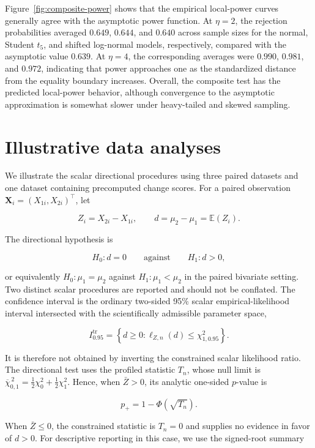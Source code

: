 \documentclass[11pt]{article}
\theoremstyle{remark}
\newcommand{\E}{\mathbb{E}}
\newcommand{\barchi}[2]{\overline{\chi}^{\,2}_{#1,#2}}
\begin{document}
Figure~\ref{fig:composite-power} shows that the empirical local-power curves generally agree with the asymptotic power function. At $\eta=2$, the rejection probabilities averaged $0.649$, $0.644$, and $0.640$ across sample sizes for the normal, Student $t_5$, and shifted log-normal models, respectively, compared with the asymptotic value $0.639$. At $\eta=4$, the corresponding averages were $0.990$, $0.981$, and $0.972$, indicating that power approaches one as the standardized distance from the equality boundary increases. Overall, the composite test has the predicted local-power behavior, although convergence to the asymptotic approximation is somewhat slower under heavy-tailed and skewed sampling.




\section{Illustrative data analyses}
\label{sec:data}

We illustrate the scalar directional procedures using three paired datasets and one dataset containing precomputed change scores. For a paired observation $\boldsymbol{X}_i=(X_{1i},X_{2i})^\top$, let

$$
Z_i=X_{2i}-X_{1i},
\qquad
d=\mu_2-\mu_1=\E(Z_i).
$$

The directional hypothesis is

$$
H_0:d=0
\qquad\text{against}\qquad
H_1:d>0,
$$

or equivalently $H_0:\mu_1=\mu_2$ against $H_1:\mu_1<\mu_2$ in the paired bivariate setting. Two distinct scalar procedures are reported and should not be conflated. The confidence interval is the ordinary two-sided 95\% scalar empirical-likelihood interval intersected with the scientifically admissible parameter space,

$$
I_{0.95}^{\mathrm{tr}}
=
\left\{d\geq 0:\ell_{Z,n}(d)\leq\chi^2_{1,0.95}\right\}.
$$

It is therefore not obtained by inverting the constrained scalar likelihood ratio. The directional test uses the profiled statistic $T_n$, whose null limit is $\barchi{0}{1}=\tfrac12\chi^2_0+\tfrac12\chi^2_1$. Hence, when $\bar Z>0$, its analytic one-sided $p$-value is

$$
p_+=1-\Phi\!\left(\sqrt{T_n}\right).
$$

When $\bar Z\leq0$, the constrained statistic is $T_n=0$ and supplies no evidence in favor of $d>0$. For descriptive reporting in this case, we use the signed-root summary
\end{document}
